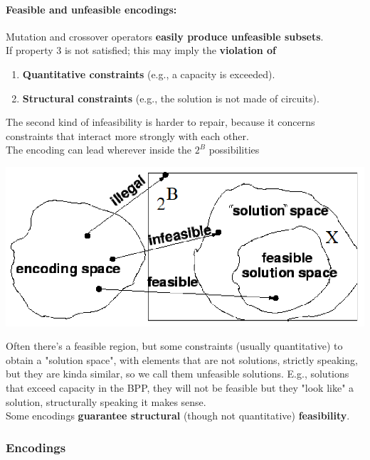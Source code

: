 \paragraph{Feasible and unfeasible encodings:} Mutation and crossover operators \textbf{easily produce unfeasible subsets}.\\

If property 3 is not satisfied; this may imply the \textbf{violation of}
\begin{enumerate}
	\item \textbf{Quantitative constraints} (e.g., a capacity is exceeded).\\
	
	\item \textbf{Structural constraints} (e.g., the solution is not made of circuits).\\
\end{enumerate}

The second kind of infeasibility is harder to repair, because it concerns constraints that interact more strongly with each other.\\

The encoding can lead wherever inside the $2^B$ possibilities
\begin{center}
	\includegraphics[width=0.75\columnwidth]{img/feasible1}
\end{center}
Often there's a feasible region, but some constraints (usually quantitative) to obtain a "solution space", with elements that are not solutions, strictly speaking, but they are kinda similar, so we call them unfeasible solutions. E.g., solutions that exceed capacity in the BPP, they will not be feasible but they "look like" a solution, structurally speaking it makes sense.\\

Some encodings \textbf{guarantee structural} (though not quantitative) \textbf{feasibility}.\\

\newpage

\subsubsection{Encodings}

